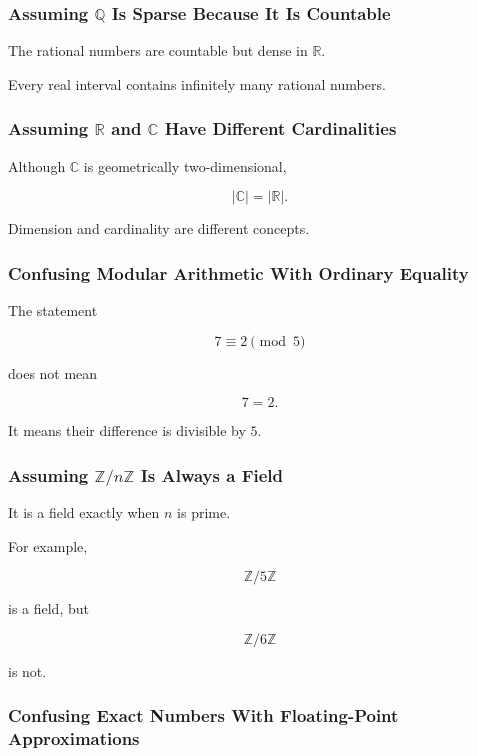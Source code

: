\subsubsection{Assuming \(\mathbb{Q}\) Is Sparse Because It Is Countable}

The rational numbers are countable but dense in \(\mathbb{R}\).

Every real interval contains infinitely many rational numbers.

\subsubsection{Assuming \(\mathbb{R}\) and \(\mathbb{C}\) Have Different Cardinalities}

Although \(\mathbb{C}\) is geometrically two-dimensional,

\[
\boxed{
|\mathbb{C}|
=
|\mathbb{R}|.
}
\]

Dimension and cardinality are different concepts.

\subsubsection{Confusing Modular Arithmetic With Ordinary Equality}

The statement

\[
\boxed{
7\equiv2\pmod5
}
\]

does not mean

\[
7=2.
\]

It means their difference is divisible by \(5\).

\subsubsection{Assuming \(\mathbb{Z}/n\mathbb{Z}\) Is Always a Field}

It is a field exactly when \(n\) is prime.

For example,

\[
\boxed{
\mathbb{Z}/5\mathbb{Z}
}
\]

is a field, but

\[
\boxed{
\mathbb{Z}/6\mathbb{Z}
}
\]

is not.

\subsubsection{Confusing Exact Numbers With Floating-Point Approximations}

